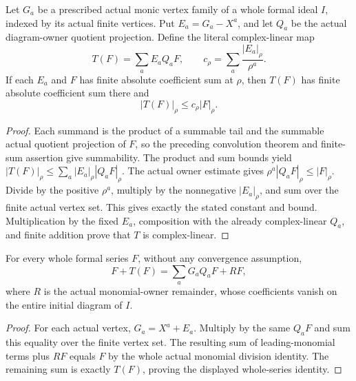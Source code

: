 \begin{theorem}
\label{hir:actual-vertex-tail-operator-bound}
\leanok
Let $G_a$ be a prescribed actual monic vertex family of a whole formal ideal $I$, indexed by its actual finite vertices. Put $E_a=G_a-X^a$, and let $Q_a$ be the actual diagram-owner quotient projection. Define the literal complex-linear map
\[
 T(F)=\sum_a E_aQ_aF,
 \qquad c_\rho=\sum_a \frac{|E_a|_\rho}{\rho^a}.
\]
If each $E_a$ and $F$ has finite absolute coefficient sum at $\rho$, then $T(F)$ has finite absolute coefficient sum there and
\[
 |T(F)|_\rho\le c_\rho |F|_\rho.
\]
\end{theorem}
\begin{proof}
Each summand is the product of a summable tail and the summable actual quotient projection of $F$, so the preceding convolution theorem and finite-sum assertion give summability. The product and sum bounds yield $|T(F)|_\rho\le\sum_a |E_a|_\rho |Q_aF|_\rho$. The actual owner estimate gives $\rho^a|Q_aF|_\rho\le |F|_\rho$. Divide by the positive $\rho^a$, multiply by the nonnegative $|E_a|_\rho$, and sum over the finite actual vertex set. This gives exactly the stated constant and bound. Multiplication by the fixed $E_a$, composition with the already complex-linear $Q_a$, and finite addition prove that $T$ is complex-linear.
\end{proof}

\begin{theorem}
\label{hir:actual-vertex-tail-reconstruction}
\leanok
For every whole formal series $F$, without any convergence assumption,
\[
 F+T(F)=\sum_a G_aQ_aF+RF,
\]
where $R$ is the actual monomial-owner remainder, whose coefficients vanish on the entire initial diagram of $I$.
\end{theorem}
\begin{proof}
For each actual vertex, $G_a=X^a+E_a$. Multiply by the same $Q_aF$ and sum this equality over the finite vertex set. The resulting sum of leading-monomial terms plus $RF$ equals $F$ by the whole actual monomial division identity. The remaining sum is exactly $T(F)$, proving the displayed whole-series identity.
\end{proof}

